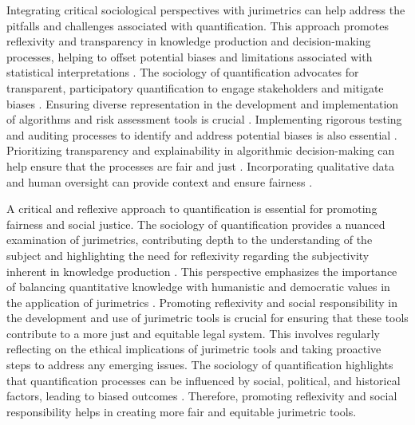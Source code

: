 Integrating critical sociological perspectives with jurimetrics can help address the pitfalls and challenges associated with quantification. This approach promotes reflexivity and transparency in knowledge production and decision-making processes, helping to offset potential biases and limitations associated with statistical interpretations \cite{internalknowledgesources}. The sociology of quantification advocates for transparent, participatory quantification to engage stakeholders and mitigate biases \cite{internalknowledgesources}. Ensuring diverse representation in the development and implementation of algorithms and risk assessment tools is crucial \cite{10.1590/dados.2022.65.3.267,10.32586/rcda.v18i1.585}. Implementing rigorous testing and auditing processes to identify and address potential biases is also essential \cite{10.1590/dados.2022.65.3.267,10.32586/rcda.v18i1.585}. Prioritizing transparency and explainability in algorithmic decision-making can help ensure that the processes are fair and just \cite{10.1590/dados.2022.65.3.267,10.32586/rcda.v18i1.585}. Incorporating qualitative data and human oversight can provide context and ensure fairness \cite{10.1590/dados.2022.65.3.267,10.32586/rcda.v18i1.585}.

A critical and reflexive approach to quantification is essential for promoting fairness and social justice. The sociology of quantification provides a nuanced examination of jurimetrics, contributing depth to the understanding of the subject and highlighting the need for reflexivity regarding the subjectivity inherent in knowledge production \cite{10.1590/dados.2022.65.3.267,10.1057/s41599-020-0396-5}. This perspective emphasizes the importance of balancing quantitative knowledge with humanistic and democratic values in the application of jurimetrics \cite{10.1590/dados.2022.65.3.267,10.1057/s41599-020-00557-0}. Promoting reflexivity and social responsibility in the development and use of jurimetric tools is crucial for ensuring that these tools contribute to a more just and equitable legal system. This involves regularly reflecting on the ethical implications of jurimetric tools and taking proactive steps to address any emerging issues. The sociology of quantification highlights that quantification processes can be influenced by social, political, and historical factors, leading to biased outcomes \cite{10.1007/s11186-021-09453-1,1023071190721}. Therefore, promoting reflexivity and social responsibility helps in creating more fair and equitable jurimetric tools.

